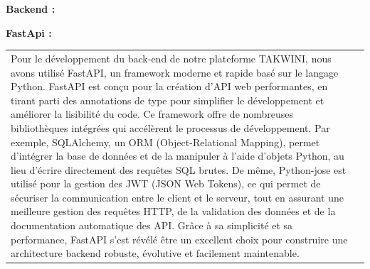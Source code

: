 \documentclass{article}
\begin{document}
\vspace{0,3cm}

\noindent \large \textbf{Backend :}

\vspace{0,5cm}
\newpage

\noindent \large \textbf{FastApi \cite{FastApi}:}

\vspace{0,3cm}

\noindent
\begin{tabular}
{@{}m{}@{\hspace{1em}}m{}@{}}
Pour le développement du back-end de notre plateforme TAKWINI, nous avons utilisé FastAPI, un framework moderne et rapide basé sur le langage Python. FastAPI est conçu pour la création d'API web performantes, en tirant parti des annotations de type pour simplifier le développement et améliorer la lisibilité du code. Ce framework offre de nombreuses bibliothèques intégrées qui accélèrent le processus de développement. Par exemple, SQLAlchemy, un ORM (Object-Relational Mapping), permet d’intégrer la base de données et de la manipuler à l’aide d’objets Python, au lieu d’écrire directement des requêtes SQL brutes. De même, Python-jose est utilisé pour la gestion des JWT (JSON Web Tokens), ce qui permet de sécuriser la communication entre le client et le serveur, tout en assurant une meilleure gestion des requêtes HTTP, de la validation des données et de la documentation automatique des API. Grâce à sa simplicité et sa performance, FastAPI s’est révélé être un excellent choix pour construire une architecture backend robuste, évolutive et facilement maintenable.

\vspace{0,2cm}


\end{tabular}
\end{document}
